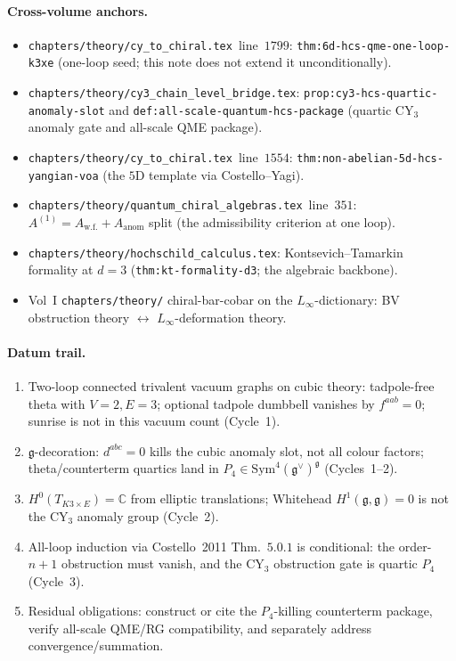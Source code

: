 \documentclass[11pt]{amsart}
\theoremstyle{definition}
\theoremstyle{remark}
\providecommand{\C}{\mathbb{C}}
\providecommand{\frakg}{\mathfrak{g}}
\providecommand{\Sym}{\mathrm{Sym}}
\begin{document}
\paragraph{Cross-volume anchors.}
\begin{itemize}
\item \texttt{chapters/theory/cy\_to\_chiral.tex}~line~$1799$:
\texttt{thm:6d-hcs-qme-one-loop-k3xe} (one-loop seed; this note
does not extend it unconditionally).
\item \texttt{chapters/theory/cy3\_chain\_level\_bridge.tex}:
\texttt{prop:cy3-hcs-quartic-anomaly-slot} and
\texttt{def:all-scale-quantum-hcs-package} (quartic CY$_3$ anomaly
gate and all-scale QME package).
\item \texttt{chapters/theory/cy\_to\_chiral.tex}~line~$1554$:
\texttt{thm:non-abelian-5d-hcs-yangian-voa} (the $5$D template via
Costello--Yagi).
\item \texttt{chapters/theory/quantum\_chiral\_algebras.tex}~line~$351$:
$A^{(1)} = A_{\mathrm{w.f.}} + A_{\mathrm{anom}}$ split (the
admissibility criterion at one loop).
\item \texttt{chapters/theory/hochschild\_calculus.tex}:
Kontsevich--Tamarkin formality at $d = 3$
(\texttt{thm:kt-formality-d3}; the algebraic backbone).
\item Vol~I \texttt{chapters/theory/} chiral-bar-cobar
on the $L_\infty$-dictionary: BV obstruction theory $\leftrightarrow$
$L_\infty$-deformation theory.
\end{itemize}

\paragraph{Datum trail.}
\begin{enumerate}
\item Two-loop connected trivalent vacuum graphs on cubic theory:
tadpole-free theta with $V=2,E=3$; optional tadpole dumbbell vanishes
by $f^{aab}=0$; sunrise is not in this vacuum count (Cycle~1).
\item $\frakg$-decoration: $d^{abc}=0$ kills the cubic anomaly slot,
not all colour factors; theta/counterterm quartics land in
$P_4\in\Sym^4(\frakg^\vee)^\frakg$ (Cycles~1--2).
\item $H^0(T_{K3\times E})=\C$ from elliptic translations; Whitehead
$H^1(\frakg,\frakg)=0$ is not the CY$_3$ anomaly group (Cycle~2).
\item All-loop induction via Costello~2011 Thm.~$5.0.1$ is conditional:
the order-$n+1$ obstruction must vanish, and the CY$_3$ obstruction
gate is quartic $P_4$ (Cycle~3).
\item Residual obligations: construct or cite the $P_4$-killing
counterterm package, verify all-scale QME/RG compatibility, and
separately address convergence/summation.
\end{enumerate}
\end{document}
